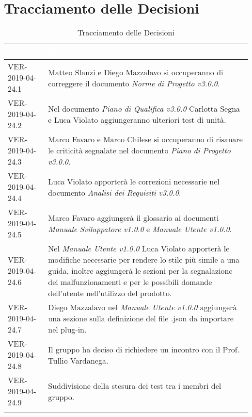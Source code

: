 \newpage
\section{Tracciamento delle Decisioni}

\begin{longtable}{|C{.33\textwidth}|C{.61\textwidth}|}
\hline
{}\textbf{\textcolor{white}{Codice}} & \textbf{\textcolor{white}{Decisione}}\\
\hline
VER-2019-04-24.1 & Matteo Slanzi e Diego Mazzalavo si occuperanno di correggere il documento \textit{Norme di Progetto v3.0.0}. \\
\hline
{}VER-2019-04-24.2 & Nel documento \textit{Piano di Qualifica v3.0.0} Carlotta Segna e Luca Violato aggiungeranno ulteriori test di unità. \\
\hline
VER-2019-04-24.3 & Marco Favaro e Marco Chilese si occuperanno di risanare le criticità segnalate nel documento \textit{Piano di Progetto v3.0.0}.  \\
\hline
{}VER-2019-04-24.4 & Luca Violato apporterà le correzioni necessarie nel documento \textit{Analisi dei Requisiti v3.0.0}.\\
\hline
VER-2019-04-24.5 & Marco Favaro aggiungerà il glossario ai documenti \textit{Manuale Sviluppatore v1.0.0} e \textit{Manuale Utente v1.0.0}. \\
\hline
{}VER-2019-04-24.6 & Nel \textit{Manuale Utente v1.0.0} Luca Violato apporterà le modifiche necessarie per rendere lo stile più simile a una guida, inoltre aggiungerà le sezioni per la segnalazione dei malfunzionamenti e per le possibili domande dell'utente nell'utilizzo del prodotto.  \\
\hline
VER-2019-04-24.7 & Diego Mazzalavo nel  \textit{Manuale Utente v1.0.0} aggiungerà una sezione sulla definizione del file .json da importare nel plug-in. \\
\hline
{} VER-2019-04-24.8 & Il gruppo ha deciso di richiedere un incontro con il Prof. Tullio Vardanega. \\
\hline
VER-2019-04-24.9 & Suddivisione della stesura dei test tra i membri del gruppo. \\
\hline

\caption{Tracciamento delle Decisioni}
\end{longtable}
